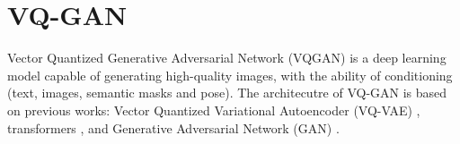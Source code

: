 \section{VQ-GAN}
\label{sec:vqgan}

Vector Quantized Generative Adversarial Network (VQGAN) \cite{vqgan} is a deep learning model capable of generating high-quality images, with the ability of conditioning (text, images, semantic masks and pose). The architecutre of VQ-GAN is based on previous works: Vector Quantized Variational Autoencoder (VQ-VAE) \cite{vqvae}, transformers \cite{transformer}, and Generative Adversarial Network (GAN) \cite{gan}.

